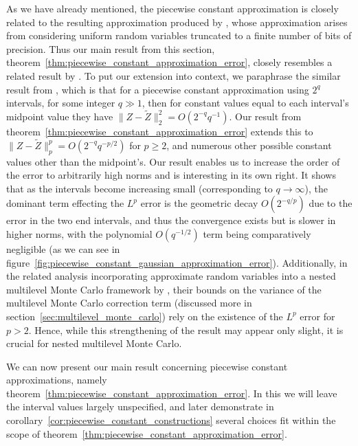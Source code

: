 \documentclass[9pt,a4paper,english]{extarticle}
\begin{document}
As we have already mentioned, the piecewise constant approximation is closely related to the resulting approximation produced by \citet{giles2019random_quadrature}, whose approximation arises from considering uniform random variables truncated to a finite number of bits of precision. Thus our main result from this section, theorem~\ref{thm:piecewise_constant_approximation_error}, closely resembles a related result by \citet[theorem~1]{giles2019random_quadrature}. To put our extension into context, we paraphrase the similar result from \citet{giles2019random_quadrature}, which is that for a piecewise constant approximation using $ 2^q $ intervals, for some integer $ q \gg 1 $, then for constant values equal to each interval's midpoint value they have $ \lVert Z - \widetilde{Z}\rVert_2^2 = O(2^{-q}q^{-1}) $. Our result from theorem~\ref{thm:piecewise_constant_approximation_error} extends this to $ \lVert Z - \widetilde{Z}\rVert_p^p = O(2^{-q} q^{-p/2}) $ for $ p \geq 2 $, and numerous other possible constant values other than the midpoint's. Our result enables us to increase the order of the error to arbitrarily high norms and is interesting in its own right. It shows that as the intervals become increasing small (corresponding to $ q \to \infty $), the dominant term effecting the $ L^p $ error is the geometric decay $ O(2^{-q/p}) $ due to the error in the two end intervals, and thus the convergence exists but is slower in higher norms, with the polynomial $ O(q^{-1/2}) $ term being comparatively negligible (as we can see in figure~\ref{fig:piecewise_constant_gaussian_approximation_error}). Additionally, in the related analysis incorporating approximate random variables into a nested multilevel Monte Carlo framework by \citeauthor{giles2020approximate} \citep{giles2020approximate,sheridan2020nested}, their bounds on the variance of the multilevel Monte Carlo correction term (discussed more in section~\ref{sec:multilevel_monte_carlo}) rely on the existence of the $ L^p $ error for $ p > 2 $. Hence, while this strengthening of the result may appear only slight, it is crucial for nested multilevel Monte Carlo. 

We can now present our main result concerning piecewise constant approximations, namely theorem~\ref{thm:piecewise_constant_approximation_error}. In this we will leave the interval values largely unspecified, and later demonstrate in corollary~\ref{cor:piecewise_constant_constructions} several choices fit within the scope of theorem~\ref{thm:piecewise_constant_approximation_error}.
\end{document}
